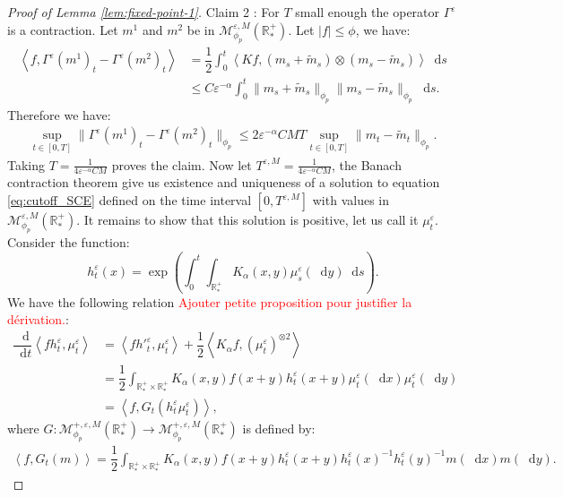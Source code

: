 \documentclass[11pt,a4paper]{article}
\newcommand{\RRP}{\mathbb{R}^+_*}
\newcommand{\MC}{\mathcal{M}}
\newcommand{\red}[1]{\textcolor{red}{#1}}
\newcommand{\brac}[1]{\left\langle#1\right\rangle}
\newcommand{\dd}{\mathop{}\!\mathrm{d}}
\begin{document}
\begin{proof}[Proof of Lemma \ref{lem:fixed-point-1}]
    Claim 2 : For $T$ small enough the operator $\Gamma^\varepsilon$ is a contraction. Let $m^1$ and $m^2$ be in $\MC^{\varepsilon,M}_{\phi_p}\left(\RRP\right)$. Let $|f| \leq \phi$, we have:
    \begin{align*}
        \brac{f,\Gamma^\varepsilon(m^1)_t - \Gamma^\varepsilon(m^2)_t}
        &= \dfrac{1}{2}\int_0^t \brac{Kf,\left(m_s + \tilde{m}_s\right)\otimes\left( m_s - \tilde{m}_s\right)} \dd s \\
        &\leq C\varepsilon^{-\alpha}\int_0^t \|m_s + \tilde{m}_s\|_{\phi_p} \|m_s - \tilde{m}_s\|_{\phi_p}\dd s .
    \end{align*}
    Therefore we have:
    \begin{align*}
        \sup\limits_{t \in [0,T]} \|\Gamma^\varepsilon(m^1)_t - \Gamma^\varepsilon(m^2)_t\|_{\phi_p} \leq 2\varepsilon^{-\alpha} CMT\sup\limits_{t \in [0,T]} \|m_t - \tilde{m}_t\|_{\phi_p} .
    \end{align*}
    Taking $T = \frac{1}{4\varepsilon^{-\alpha}CM}$ proves the claim. Now let $T^{\varepsilon,M} = \frac{1}{4\varepsilon^{-\alpha}CM}$, the Banach contraction theorem give us existence and uniqueness of a solution to equation \eqref{eq:cutoff_SCE} defined on the time interval $[0,T^{\varepsilon,M}]$ with values in $\MC^{\varepsilon,M}_{\phi_p}\left(\RRP\right)$. It remains to show that this solution is positive, let us call it $\mu_t^\varepsilon$. Consider the function:
    \[
    h^\varepsilon_t(x) = \exp\left(\int_0^t\int_{\RRP}K_\alpha (x,y) \mu^\varepsilon_s(\dd y) \dd s\right).
    \]
    We have the following relation \red{Ajouter petite proposition pour justifier la dérivation.}:
    \begin{align*}
        \dfrac{\dd}{\dd t}\brac{fh^\varepsilon_t,\mu^\varepsilon_t} &= \brac{fh'^{\varepsilon}_t,\mu^\varepsilon_t} + \dfrac{1}{2}\brac{K_\alpha f,\left(\mu^\varepsilon_t\right)^{\otimes 2}}\\
        &= \dfrac{1}{2}\int_{\RRP\times\RRP} K_\alpha(x,y) f(x+y)h^\varepsilon_t(x+y)\mu^\varepsilon_t(\dd x)\mu^\varepsilon_t(\dd y) \\
        &= \brac{f,G_t(h^\varepsilon_t\mu^\varepsilon_t)},
    \end{align*}
    where $G : \MC^{+,\varepsilon,M}_{\phi_p}(\RRP) \to \MC^{+,\varepsilon,M}_{\phi_p}(\RRP)$ is defined by:
    \begin{align*}
        \brac{f,G_t(m)} =  \dfrac{1}{2}\int_{\RRP\times\RRP} K_\alpha(x,y) f(x+y)h^\varepsilon_t(x+y) h^\varepsilon_t(x)^{-1} h^\varepsilon_t(y)^{-1}m(\dd x)m(\dd y).
    \end{align*}

\end{proof}
\end{document}
